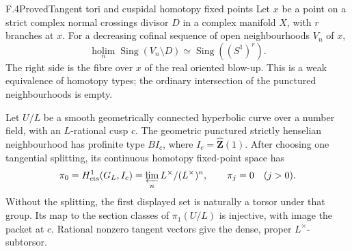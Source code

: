 \begin{statement}{F.4}{Proved}{Tangent tori and cuspidal homotopy fixed points}
Let $x$ be a point on a strict complex normal crossings divisor $D$ in a
complex manifold $X$, with $r$ branches at $x$. For a decreasing cofinal
sequence of open neighbourhoods $V_n$ of $x$,
\[
 \operatorname*{holim}_n\operatorname{Sing}(V_n\setminus D)
       \simeq \operatorname{Sing}((S^1)^r).
\]
The right side is the fibre over $x$ of the real oriented blow-up. This
is a weak equivalence of homotopy types; the ordinary intersection of
the punctured neighbourhoods is empty.

Let $U/L$ be a smooth geometrically connected hyperbolic curve over a
number field, with an $L$-rational cusp $c$. The geometric punctured
strictly henselian neighbourhood has profinite type $B I_c$, where
$I_c=\widehat{\mathbf Z}(1)$. After choosing one tangential splitting,
its continuous homotopy fixed-point space has
\[
 \pi_0=H^1_{\mathrm{cts}}(G_L,I_c)
       =\varprojlim_n L^\times/(L^\times)^n,
 \qquad \pi_j=0\quad(j>0).
\]
Without the splitting, the first displayed set is naturally a torsor
under that group. Its map to the section classes of $\pi_1(U/L)$ is
injective, with image the packet at $c$. Rational nonzero tangent
vectors give the dense, proper $L^\times$-subtorsor.
\end{statement}
